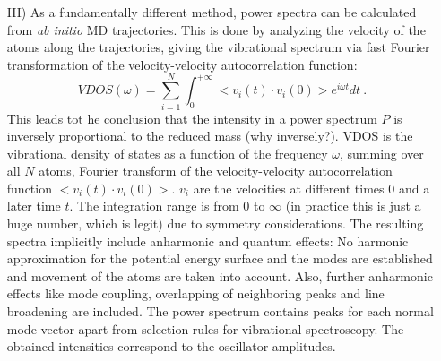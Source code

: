 \documentclass[11pt,DIV=13,BCOR=5mm,a4paper,headinclude]{scrbook}
\begin{document}
\begin{itemize}
\item[III)] As a fundamentally different method, power spectra can be calculated from \textit{ab initio} MD trajectories\cite{VAC}.
This is done by analyzing the velocity of the atoms along the trajectories, giving the vibrational spectrum via fast Fourier transformation of the velocity-velocity autocorrelation function:
\begin{equation}
 VDOS(\omega)=\sum_{i=1}^N\int_{0}^{+\infty}<v_i(t)\cdot v_i(0)>e^{i\omega t}dt ~.
\end{equation}
This leads tot he conclusion that the intensity in a power spectrum $P$ is inversely proportional to the reduced mass (why inversely?).
VDOS is the vibrational density of states as a function of the frequency $\omega$, summing over all $N$ atoms, Fourier transform of the velocity-velocity autocorrelation function $<v_i(t)\cdot v_i(0)>$.
$v_i$ are the velocities at different times $0$ and a later time $t$.
The integration range is from $0$ to $\infty$ (in practice this is just a huge number, which is legit) due to symmetry considerations.
The resulting spectra implicitly include anharmonic and quantum effects: No harmonic approximation for the potential energy surface and the modes are established and movement of the atoms are taken into account.
Also, further anharmonic effects like mode coupling, overlapping of neighboring peaks and line broadening are included\cite{hornicek2007,hudecova2012}.
The power spectrum contains peaks for each normal mode vector apart from selection rules for vibrational spectroscopy.
The obtained intensities correspond to the oscillator amplitudes.
\end{itemize}
\end{document}
